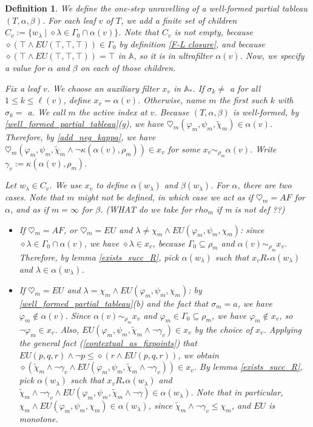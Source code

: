 \documentclass[11pt]{article}
\newcommand{\A}{{\mathbb A}}
\newtheorem{definition}{Definition}[section]
\begin{document}
\begin{definition}\label{one-step_unravelling}
    We define the \emph{one-step unravelling} of a well-formed partial tableau $(T,\alpha,\beta)$. For each leaf $v$ of $T$, we add a finite set of children $C_v:=\{w_\lambda\mid\diamond\lambda\in\Gamma_0\cap\alpha(v)\}$. Note that $C_v$ is not empty, because $\diamond(\top\wedge EU(\top,\top,\top))\in\Gamma_0$ by definition \ref{F-L closure}, and because $\diamond(\top\wedge EU(\top,\top,\top))=\top$ in $\A$, so it is in ultrafilter $\alpha(v)$. Now, we specify a value for $\alpha$ and $\beta$ on each of those children.

    Fix a leaf $v$. We choose an auxiliary filter $x_v$ in $\A_*$. If $\sigma_k\not=$ a for all $1\leq k \leq \ell(v)$, define $x_v=\alpha(v)$. Otherwise, name $m$ the first such $k$ with $\sigma_k=$ a. We call $m$ the \emph{active index} at $v$. Because $(T,\alpha,\beta)$ is well-formed, by \ref{well_formed_partial_tableau}(g), we have $\heartsuit_m(\varphi_m,\psi_m,\tilde{\chi}_m)\in\alpha(v)$. Therefore, by \ref{add_neg_kappa}, we have $\heartsuit_m(\varphi_m,\psi_m,\tilde{\chi}_m\wedge\neg\kappa(\alpha(v),\rho_m))\in x_v$ for some $x_v\sim_{\rho_m}\alpha(v)$. Write $\gamma_v:=\kappa(\alpha(v),\rho_m)$.
    
    Let $w_\lambda\in C_v$. We use $x_v$ to define $\alpha(w_\lambda)$ and $\beta(w_\lambda)$. For $\alpha$, there are two cases. Note that $m$ might not be defined, in which case we act as if $\heartsuit_m=AF$ for $\alpha$, and as if $m=\infty$ for $\beta$. (WHAT do we take for $rho_m$ if m is not def ??)
    \begin{itemize}
        \item If $\heartsuit_m=AF$, or $\heartsuit_m=EU$ and $\lambda\not=\chi_m\wedge EU(\varphi_m,\psi_m,\chi_m)$: since $\diamond\lambda\in\Gamma_0\cap\alpha(v)$, we have $\diamond\lambda\in x_v$, because $\Gamma_0\subseteq\rho_m$ and $\alpha(v)\sim_{\rho_m} x_v$. Therefore, by lemma \ref{exists_succ_R}, pick $\alpha(w_\lambda)$ such that $x_vR_*\alpha(w_\lambda)$ and $\lambda\in\alpha(w_\lambda)$.
        \item If $\heartsuit_m=EU$ and $\lambda=\chi_m\wedge EU(\varphi_m,\psi_m,\chi_m)$: by \ref{well_formed_partial_tableau}(b) and the fact that $\sigma_m=a$, we have $\varphi_m\notin\alpha(v)$. Since $\alpha(v)\sim_{\rho_m} x_v$ and $\varphi_m\in\Gamma_0\subseteq\rho_m$, we have $\varphi_m\notin x_v$, so $\neg\varphi_m\in x_v$. Also, $EU(\varphi_m,\psi_m,\tilde{\chi}_m\wedge\neg\gamma_v)\in x_v$ by the choice of $x_v$. Applying the general fact (\ref{contextual_as_fixpoints}) that $EU(p,q,r)\wedge \neg p\leq\diamond(r\wedge EU(p,q,r))$, we obtain $\diamond(\tilde{\chi}_m\wedge\neg\gamma_v\wedge EU(\varphi_m,\psi_m,\tilde{\chi}_m\wedge\neg\gamma_v))\in x_v$. By lemma \ref{exists_succ_R}, pick $\alpha(w_\lambda)$ such that $x_vR_*\alpha(w_\lambda)$ and $\tilde{\chi}_m\wedge\neg\gamma_v\wedge EU(\varphi_m,\psi_m,\tilde{\chi}_m\wedge\neg\gamma)\in\alpha(w_\lambda)$. Note that in particular, $\chi_m\wedge EU(\varphi_m,\psi_m,\chi_m)\in\alpha(w_\lambda)$, since $\tilde{\chi}_m\wedge\neg\gamma_v\leq\chi_m$, and $EU$ is monotone.
    \end{itemize}
    

\end{definition}
\end{document}
